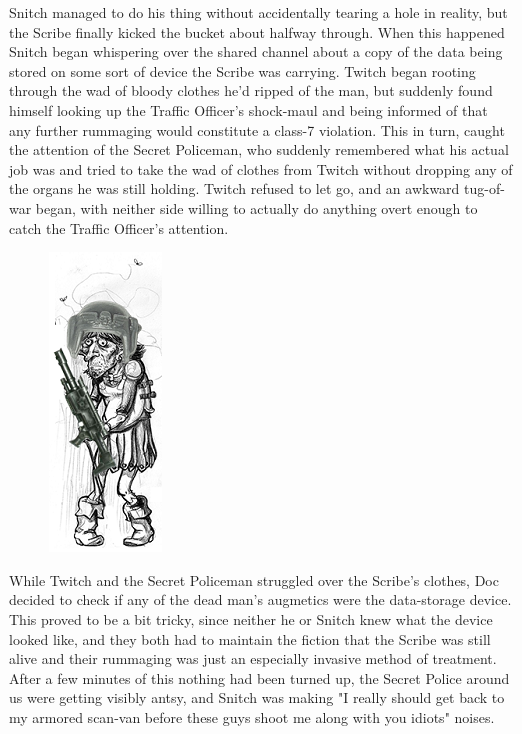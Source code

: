 Snitch managed to do his thing without accidentally tearing a hole in reality, but the Scribe finally kicked the bucket about halfway through. 
When this happened Snitch began whispering over the shared channel about a copy of the data being stored on some sort of device the Scribe was carrying. 
Twitch began rooting through the wad of bloody clothes he'd ripped of the man, but suddenly found himself looking up the Traffic Officer's shock-maul and being informed of that any further rummaging would constitute a class-7 violation. 
This in turn, caught the attention of the Secret Policeman, who suddenly remembered what his actual job was and tried to take the wad of clothes from Twitch without dropping any of the organs he was still holding. 
Twitch refused to let go, and an awkward tug-of-war began, with neither side willing to actually do anything overt enough to catch the Traffic Officer's attention.

\begin{figure}
	\begin{center}
		\includegraphics[width=\figwidth]{pics/17/53.png}
	\end{center}
\end{figure}
While Twitch and the Secret Policeman struggled over the Scribe's clothes, Doc decided to check if any of the dead man's augmetics were the data-storage device. 
This proved to be a bit tricky, since neither he or Snitch knew what the device looked like, and they both had to maintain the fiction that the Scribe was still alive and their rummaging was just an especially invasive method of treatment. 
After a few minutes of this nothing had been turned up, the Secret Police around us were getting visibly antsy, and Snitch was making "I really should get back to my armored scan-van before these guys shoot me along with you idiots" noises. 


